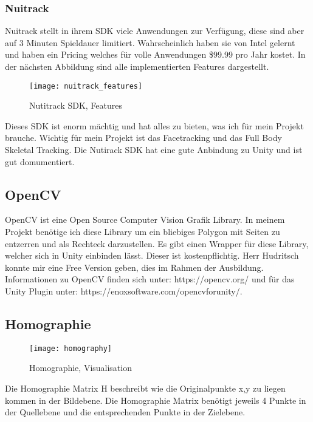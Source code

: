 			
\subsubsection{Nuitrack}

Nuitrack stellt in ihrem SDK viele Anwendungen zur Verf\"ugung, diese sind aber auf 3 Minuten Spieldauer limitiert. Wahrscheinlich haben sie von Intel gelernt und haben ein Pricing welches f\"ur volle Anwendungen \$99.99 pro Jahr kostet. In der nächsten Abbildung sind alle implementierten Features dargestellt.

\begin{figure}[hbt!]
\texttt{[image: nuitrack\_features]}
\caption{Nutitrack SDK, Features}
\end{figure}

Dieses SDK ist enorm m\"achtig und hat alles zu bieten, was ich für mein Projekt brauche. Wichtig für mein Projekt ist das Facetracking und das Full Body Skeletal Tracking. Die Nutirack SDK hat eine gute Anbindung zu Unity und ist gut domumentiert.
\cite{NuitrackSDK} 

\subsection{OpenCV}

OpenCV ist eine Open Source Computer Vision Grafik Library. In meinem Projekt benötige ich diese Library um ein bliebiges Polygon mit Seiten zu entzerren und als Rechteck darzustellen. Es gibt einen Wrapper für diese Library, welcher sich in Unity einbinden lässt. 
Dieser ist kostenpflichtig. Herr Hudritsch konnte mir eine Free Version geben, dies im Rahmen der Ausbildung.
Informationen zu OpenCV finden sich unter: https://opencv.org/ und für das Unity Plugin unter: https://enoxsoftware.com/opencvforunity/.
			
\subsection{Homographie}

\vspace{0.5in}

\begin{figure}[hbt!]
\texttt{[image: homography]}
\caption{Homographie, Visualisation}
\end{figure}
		
Die Homographie Matrix H beschreibt wie die Originalpunkte x,y zu liegen kommen in der Bildebene. Die Homographie Matrix ben\"otigt jeweils 4 Punkte in der Quellebene und die entsprechenden Punkte in der Zielebene. \\ 
		
